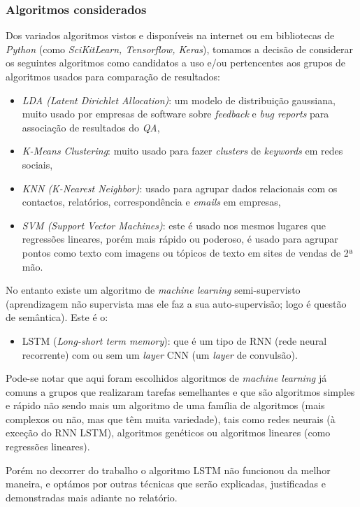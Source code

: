 \subsubsection{Algoritmos considerados}

Dos variados algoritmos vistos e disponíveis na internet ou em bibliotecas de \textit{Python} (como \textit{SciKitLearn, Tensorflow, Keras}), tomamos a decisão de considerar os seguintes algoritmos como candidatos a uso e/ou pertencentes aos grupos de algoritmos usados para comparação de resultados:
\begin{itemize}
  \item \textit{LDA (Latent Dirichlet Allocation)}: um modelo de distribuição gaussiana, muito usado por empresas de software sobre \textit{feedback} e \textit{bug reports} para associação de resultados do \textit{QA},
  \item \textit{K-Means Clustering}: muito usado para fazer \textit{clusters} de \textit{keywords} em redes sociais,
  \item \textit{KNN (K-Nearest Neighbor)}: usado para agrupar dados relacionais com os contactos, relatórios, correspondência e \textit{emails} em empresas,
  \item \textit{SVM (Support Vector Machines)}: este é usado nos mesmos lugares que regressões lineares, porém mais rápido ou poderoso, é usado para agrupar pontos como texto com imagens ou tópicos de texto em sites de vendas de 2ª mão.
\end{itemize}

No entanto existe um algoritmo de \textit{machine learning} semi-supervisto (aprendizagem não supervista mas ele faz a sua auto-supervisão; logo é questão de semântica).
Este é o:
\begin{itemize}
  \item LSTM (\textit{Long-short term memory}): que é um tipo de RNN (rede neural recorrente) com ou sem um \textit{layer} CNN (um \textit{layer} de convulsão).
\end{itemize}

Pode-se notar que aqui foram escolhidos algoritmos de \textit{machine learning} já comuns a grupos que realizaram tarefas semelhantes e que são algoritmos simples e rápido não sendo mais um algoritmo de uma família de algoritmos (mais complexos ou não, mas que têm muita variedade), tais como redes neurais (à exceção do RNN LSTM), algoritmos genéticos ou algoritmos lineares (como regressões lineares).

Porém no decorrer do trabalho o algoritmo LSTM não funcionou da melhor maneira, e optámos por outras técnicas que serão explicadas, justificadas e demonstradas mais adiante no relatório.